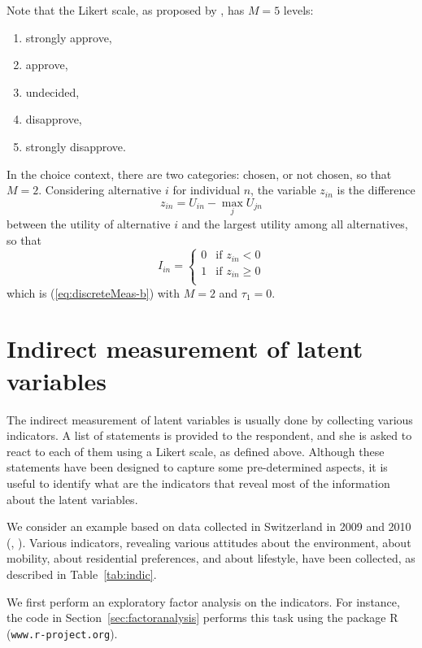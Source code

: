 \documentclass[12pt,a4paper]{article}
\newcommand{\req}[1]{(\ref{#1})}
\begin{document}
Note that the Likert scale, as proposed by , has $M=5$ levels: 
\begin{enumerate}
\item strongly approve,
\item approve,
\item undecided,
\item disapprove,
\item strongly disapprove. 
\end{enumerate}

In the choice context, there are two categories: chosen, or not
chosen, so that $M=2$. Considering alternative $i$ for individual $n$,
the variable $z_{in}$ is the difference
\begin{equation}
z_{in} = U_{in} - \max_{j} U_{jn}
\end{equation}
 between the utility of alternative $i$ and the largest utility among all
alternatives, so that
\begin{equation}
I_{in}= \left\{
\begin{array}{ll}  
0 & \text{if } z_{in} < 0 \\
1 & \text{if } z_{in} \geq 0 \\
\end{array}
\right.
\end{equation}
which is \req{eq:discreteMeas-b} with $M=2$ and $\tau_1=0$.


\section{Indirect measurement of latent variables}

The indirect measurement of latent variables is usually done by
collecting various indicators. A list of statements is provided to the
respondent, and she is asked to react to each of them using a Likert scale, as
defined above. Although these statements have been designed to capture
some pre-determined aspects, it is useful to identify what are the
indicators that reveal most of the information about the latent
variables. 

We consider an example based on data collected in Switzerland in 2009
and 2010 (\cite{AtaGleBier_ICMC2011}, \cite{AtaGlerBier2012_DISP}). Various indicators, revealing various attitudes about the
environment, about mobility, about residential preferences, and about
lifestyle, have been collected, as described in Table~\ref{tab:indic}.

We first perform an exploratory factor analysis on the indicators. For
instance, the code in Section~\ref{sec:factoranalysis} performs this
task using the package R (\verb+www.r-project.org+). 
\end{document}
